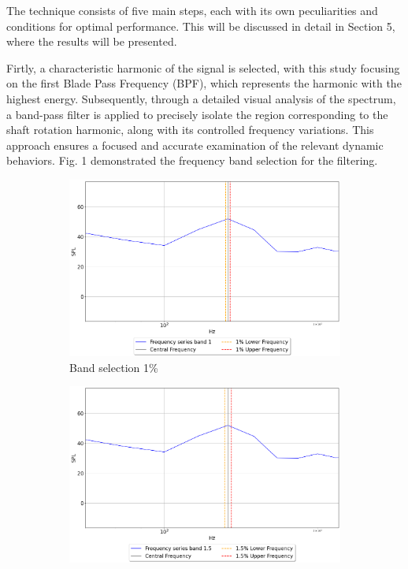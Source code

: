 \documentclass[10pt,fleqn,a4paper,twoside]{article}
\begin{document}
The technique consists of five main steps, each with its own peculiarities and conditions for optimal performance. This will be discussed in detail in Section 5, where the results will be presented.

Firtly, a characteristic harmonic of the signal is selected, with this study focusing on the first Blade Pass Frequency (BPF), which represents the harmonic with the highest energy. Subsequently, through a detailed visual analysis of the spectrum, a band-pass filter is applied to precisely isolate the region corresponding to the shaft rotation harmonic, along with its controlled frequency variations. This approach ensures a focused and accurate examination of the relevant dynamic behaviors. Fig. 1 demonstrated the frequency band selection for the filtering.
\begin{figure}
    \centering
    \begin{subfigure}{0.4\textwidth}
        \includegraphics[width=\textwidth]{Figures/spectra_band_1.png}
        \caption{Band selection 1\%}
        \label{fig:first}
    \end{subfigure}
    \hfill
    \centering
    \begin{subfigure}{0.4\textwidth}
        \includegraphics[width=\textwidth]{Figures/spectra_band_1.5.png}

\end{subfigure}
\end{figure}
\end{document}
